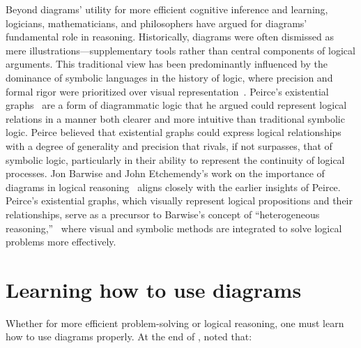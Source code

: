 Beyond diagrams' utility for more efficient cognitive inference and learning, logicians, mathematicians, and philosophers have argued for diagrams' fundamental role in reasoning. Historically, diagrams were often dismissed as mere illustrations---supplementary tools rather than central components of logical arguments. This traditional view has been predominantly influenced by the dominance of symbolic languages in the history of logic, where precision and formal rigor were prioritized over visual representation~\cite{shin_diagrams_2018}. Peirce's existential graphs~\cite{peirce_collected_1931} are a form of diagrammatic logic that he argued could represent logical relations in a manner both clearer and more intuitive than traditional symbolic logic. Peirce believed that existential graphs could express logical relationships with a degree of generality and precision that rivals, if not surpasses, that of symbolic logic, particularly in their ability to represent the continuity of logical processes. Jon Barwise and John Etchemendy's work on the importance of diagrams in logical reasoning~\cite{barwise_visual_2019} aligns closely with the earlier insights of Peirce. Peirce's existential graphs, which visually represent logical propositions and their relationships, serve as a precursor to Barwise's concept of ``heterogeneous reasoning,''~\cite{barwise_heterogeneous_1993} where visual and symbolic methods are integrated to solve logical problems more effectively. 





\section{Learning how to use diagrams}


Whether for more efficient problem-solving or logical reasoning, one must learn how to use diagrams properly. At the end of , \citet{whyDiagramWorth} noted that:

